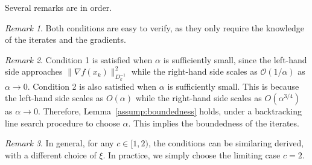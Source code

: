 \documentclass{article}
\theoremstyle{plain}
\theoremstyle{remark}
\newtheorem*{remark}{Remark}
\begin{document}
Several remarks are in order.
\begin{remark}
Both conditions are easy to verify, as they only require the knowledge of the iterates and the gradients.
\end{remark}
\begin{remark}
Condition 1 is satisfied when $\alpha$ is sufficiently small, since the left-hand side approaches $\|\nabla f(x_k)\|_{D_k^{-1}}^2$ while the right-hand side scales as $\mathcal{O}(1/\alpha)$ as $\alpha\to 0$.
Condition 2 is also satisfied when $\alpha$ is sufficiently small. This is because the left-hand side scales as $O(\alpha)$ while the right-hand side scales as $O(\alpha^{3/4})$ as $\alpha\to 0$.
Therefore, Lemma~\ref{assump:boundedness} holds, under a backtracking line search procedure to choose $\alpha$. This implies the boundedness of the iterates.
\end{remark}

\begin{remark}
    In general, for any $c\in [1,2)$, the conditions can be similaring derived, with a different choice of $\xi$. In practice, we simply choose the limiting case $c=2$.
\end{remark}
\end{document}
